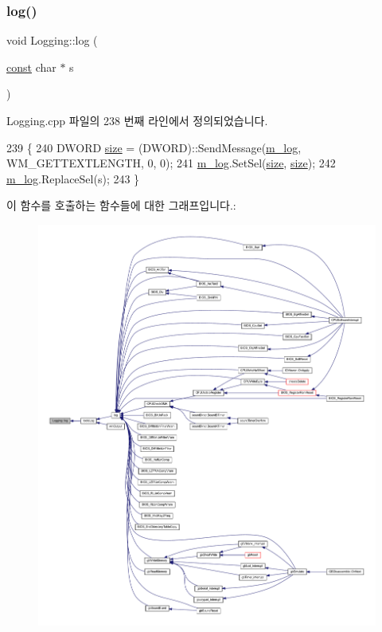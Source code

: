 \subsubsection{\texorpdfstring{log()}{log()}}
{\footnotesize\ttfamily void Logging\+::log (\begin{DoxyParamCaption}\item[{\mbox{\hyperlink{getopt1_8c_a2c212835823e3c54a8ab6d95c652660e}{const}} char $\ast$}]{s }\end{DoxyParamCaption})}



Logging.\+cpp 파일의 238 번째 라인에서 정의되었습니다.


\begin{DoxyCode}
239 \{
240   DWORD \mbox{\hyperlink{expr-lex_8cpp_ab7d671599a7b25ca99a487fa341bc33a}{size}} = (DWORD)::SendMessage(\mbox{\hyperlink{class_logging_ab1fbdc0eaf2afc3f7f493a3c9605511c}{m\_log}}, WM\_GETTEXTLENGTH, 0, 0);
241   \mbox{\hyperlink{class_logging_ab1fbdc0eaf2afc3f7f493a3c9605511c}{m\_log}}.SetSel(\mbox{\hyperlink{expr-lex_8cpp_ab7d671599a7b25ca99a487fa341bc33a}{size}}, \mbox{\hyperlink{expr-lex_8cpp_ab7d671599a7b25ca99a487fa341bc33a}{size}});
242   \mbox{\hyperlink{class_logging_ab1fbdc0eaf2afc3f7f493a3c9605511c}{m\_log}}.ReplaceSel(s);
243 \}
\end{DoxyCode}
이 함수를 호출하는 함수들에 대한 그래프입니다.\+:
\nopagebreak
\begin{figure}[H]
\begin{center}
\leavevmode
\includegraphics[width=350pt]{class_logging_a01865a1ae55994b43fb518909bbe1552_icgraph}
\end{center}
\end{figure}
\mbox{\label{class_logging_a3f790eea70e4747a0279fab3ccc4de33}} 
